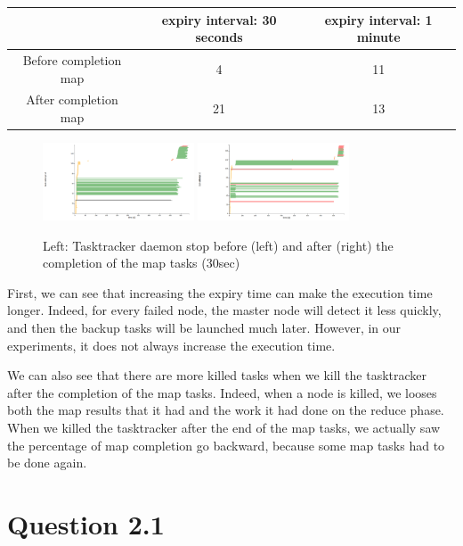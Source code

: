\documentclass{article}
\begin{document}
\begin{center}
\begin{tabular}{|c|c|c|}
\hline
\ & expiry interval: 30 seconds & expiry interval: 1 minute \\
\hline
Before completion map & 4 & 11 \\
\hline
After completion map & 21 & 13 \\
\hline
\end{tabular}
\end{center}


\begin{figure}%
  \centering
  \includegraphics[width=0.4\textwidth]{expiry30before.png}
  \includegraphics[width=0.4\textwidth]{expiry30after.png}
  \caption{Left: Tasktracker daemon stop before (left) and after (right) the completion of the map tasks (30sec)}
  \label{kill}
\end{figure}


First, we can see that increasing the expiry time can make the execution time longer. Indeed, for every failed node, the master node will detect it less quickly, and then the backup tasks will be launched much later. However, in our experiments, it does not always increase the execution time.

We can also see that there are more killed tasks when we kill the tasktracker after the completion of the map tasks. Indeed, when a node is killed, we looses both the map results that it had and the work it had done on the reduce phase. When we killed the tasktracker after the end of the map tasks, we actually saw the percentage of map completion go backward, because some map tasks had to be done again.

\section*{Question 2.1}
\end{document}
